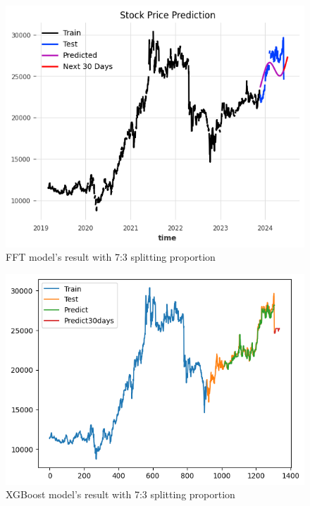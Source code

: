 \documentclass{ieeeojies}
\begin{document}
\begin{figure}[H]
  \centering
  \begin{minipage}{0.6\linewidth}
    \centering
    \includegraphics[width=\linewidth]{bibliography/diagram/FFT-ACB.png}
    \caption{FFT model’s result with 7:3 splitting proportion}
    \label{fig8}
  \end{minipage}
\end{figure}

\begin{figure}[H]
  \centering
  \begin{minipage}{0.6\linewidth}
    \centering
    \includegraphics[width=\linewidth]{bibliography/diagram/XGBoost-ACB.png}
    \caption{XGBoost model’s result with 7:3 splitting proportion}
    \label{fig8}
  \end{minipage}
\end{figure}
\end{document}
